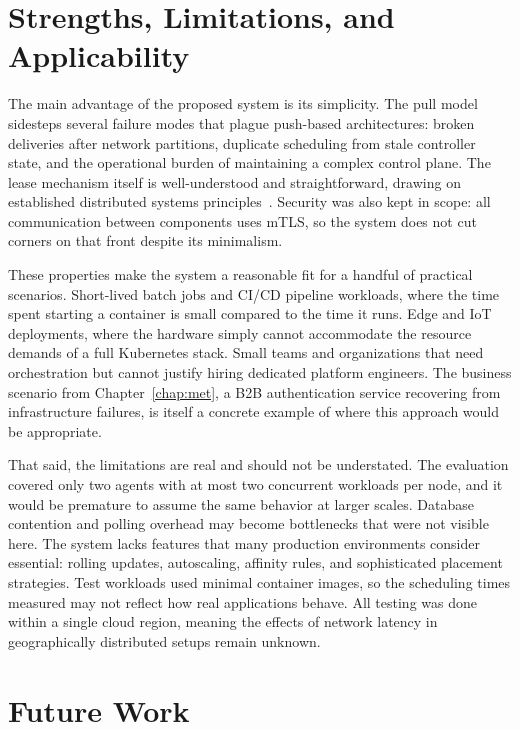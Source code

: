 \section{Strengths, Limitations, and Applicability}

The main advantage of the proposed system is its simplicity. The pull model sidesteps several failure modes that plague push-based architectures: broken deliveries after network partitions, duplicate scheduling from stale controller state, and the operational burden of maintaining a complex control plane. The lease mechanism itself is well-understood and straightforward, drawing on established distributed systems principles~\cite{gray1989leases}. Security was also kept in scope: all communication between components uses mTLS, so the system does not cut corners on that front despite its minimalism.

These properties make the system a reasonable fit for a handful of practical scenarios. Short-lived batch jobs and CI/CD pipeline workloads, where the time spent starting a container is small compared to the time it runs. Edge and IoT deployments, where the hardware simply cannot accommodate the resource demands of a full Kubernetes stack. Small teams and organizations that need orchestration but cannot justify hiring dedicated platform engineers. The business scenario from Chapter~\ref{chap:met}, a B2B authentication service recovering from infrastructure failures, is itself a concrete example of where this approach would be appropriate.

That said, the limitations are real and should not be understated. The evaluation covered only two agents with at most two concurrent workloads per node, and it would be premature to assume the same behavior at larger scales. Database contention and polling overhead may become bottlenecks that were not visible here. The system lacks features that many production environments consider essential: rolling updates, autoscaling, affinity rules, and sophisticated placement strategies. Test workloads used minimal container images, so the scheduling times measured may not reflect how real applications behave. All testing was done within a single cloud region, meaning the effects of network latency in geographically distributed setups remain unknown.

\section{Future Work}

